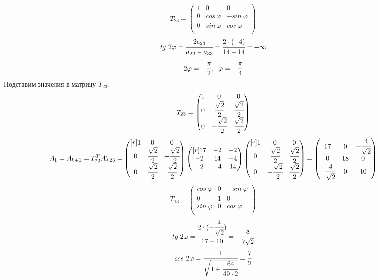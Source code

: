 \documentclass[12pt]{article}
\theoremstyle{definition}
\numberwithin{equation}{section}
\begin{document}
\[T_{23} = \begin{pmatrix}
1 & 0 & 0\\
0 & cos ~\varphi & -sin ~\varphi\\
0 & sin ~\varphi & cos ~\varphi\\
\end{pmatrix}\]
$$tg ~2\varphi =\cfrac{2 a_{23}}{a_{22}-a_{33}}=\cfrac{2\cdot (-4)}{14-14}=-\infty$$
$$2\varphi =-\cfrac{\pi}{2},~~\varphi=-\cfrac{\pi}{4}$$
Подставим значения в матрицу $T_{23}$.
\[T_{23} = \begin{pmatrix}
1 & 0 & 0\\
0 & \cfrac{\sqrt{2}}{2} & \cfrac{\sqrt{2}}{2}\\
0 & -\cfrac{\sqrt{2}}{2} & \cfrac{\sqrt{2}}{2}\\
\end{pmatrix}\]
\[A_1=A_{k+1} = T_{23}^T A T_{23}=\begin{pmatrix}[r]
1 & 0 & 0\\
0 & \cfrac{\sqrt{2}}{2} & -\cfrac{\sqrt{2}}{2}\\
0 & \cfrac{\sqrt{2}}{2} & \cfrac{\sqrt{2}}{2}\\
\end{pmatrix} \begin{pmatrix}[r]
17 & -2 & -2\\
-2 & 14 & -4\\
-2 & -4 & 14\\
\end{pmatrix} \begin{pmatrix}[r]
1 & 0 & 0\\
0 & \cfrac{\sqrt{2}}{2} & \cfrac{\sqrt{2}}{2}\\
0 & -\cfrac{\sqrt{2}}{2} & \cfrac{\sqrt{2}}{2}\\
\end{pmatrix}=\begin{pmatrix}
17 & 0 & -\cfrac{4}{\sqrt{2}}\\
0 & 18 & 0\\
-\cfrac{4}{\sqrt{2}} & 0 & 10\\
\end{pmatrix}\]
\[T_{13} = \begin{pmatrix}
cos ~\varphi & 0 & -sin ~\varphi\\
0 & 1 & 0\\
sin ~\varphi & 0 & cos ~\varphi\\
\end{pmatrix}\]
$$tg ~2\varphi=\cfrac{2\cdot (-\cfrac{4}{\sqrt{2}})}{17-10}=-\cfrac{8}{7\sqrt{2}}$$
$$cos ~2\varphi=\cfrac{1}{\sqrt{1+\cfrac{64}{49\cdot 2}}}=\cfrac{7}{9}$$
\end{document}
